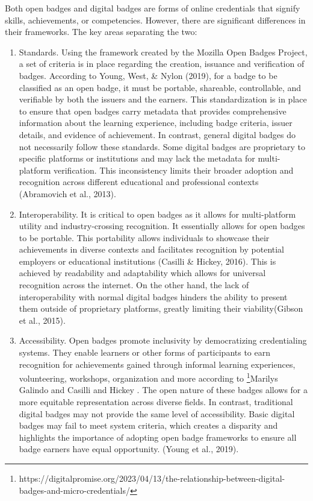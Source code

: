 %
Both open badges and digital badges are forms of online credentials that signify skills, achievements, or competencies. 
However, there are significant differences in their frameworks. The key areas separating the two:
\begin{enumerate}
    \addtolength{\itemsep}{-0.5\baselineskip} 
  \item {Standards.} Using the framework created by the Mozilla Open Badges Project, a set of criteria is in place regarding the creation, issuance and verification of badges. 
  According to Young, West, \& Nylon (2019)\cite{whatIsAnOpenBadge}, for a badge to be classified as an open badge, it must be portable, shareable, controllable, and verifiable by both the issuers and the earners. 
  This standardization is in place to ensure that open badges carry metadata that provides comprehensive information about the learning experience, including badge criteria, issuer details, and evidence of achievement. 
  In contrast, general digital badges do not necessarily follow these standards. 
  Some digital badges are proprietary to specific platforms or institutions and may lack the metadata for multi-platform verification. 
  This inconsistency limits their broader adoption and recognition across different educational and professional contexts (Abramovich et al., 2013)\cite{areBadgesUseful}.
  \item {Interoperability.} It is critical to open badges as it allows for multi-platform utility and industry-crossing recognition. 
  It essentially allows for open badges to be portable. This portability allows individuals to showcase their achievements in diverse contexts and facilitates recognition by potential employers or educational institutions (Casilli \& Hickey, 2016)\cite{credentialsBadges}. 
  This is achieved by readability and adaptability which allows for universal recognition across the internet. 
  On the other hand, the lack of interoperability with normal digital badges hinders the ability to present them outside of proprietary platforms, greatly limiting their viability(Gibson et al., 2015)\cite{areBadgesUseful}.
  \item {Accessibility.} Open badges promote inclusivity by democratizing credentialing systems. 
  They enable learners or other forms of participants to earn recognition for achievements gained through informal learning experiences, volunteering, workshops, organization and more according to \footnote{https://digitalpromise.org/2023/04/13/the-relationship-between-digital-badges-and-micro-credentials/}Marilys Galindo and Casilli and Hickey \cite {credentialsBadges}. 
  The open nature of these badges allows for a more equitable representation across diverse fields. 
  In contrast, traditional digital badges may not provide the same level of accessibility. Basic digital badges may fail to meet system criteria, which creates a disparity and highlights the importance of adopting open badge frameworks to ensure all badge earners have equal opportunity. (Young et al., 2019)\cite {whatIsAnOpenBadge}. 
\end{enumerate}

